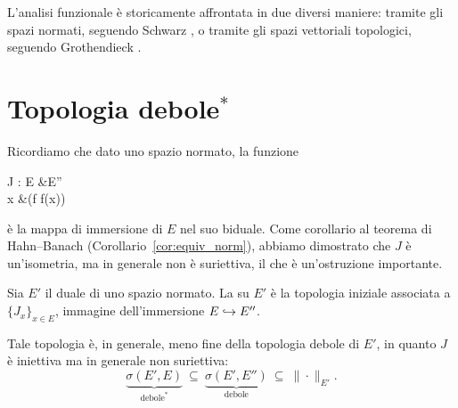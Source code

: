L'analisi funzionale è storicamente affrontata in due diversi maniere: tramite gli spazi normati, seguendo Schwarz \cite{dunford1958linear,dunford1965linear}, o tramite gli spazi vettoriali topologici, seguendo Grothendieck \cite{grothendieck1973topological}.

\section{Topologia debole$^*$}
Ricordiamo che dato uno spazio normato, la funzione
\begin{eqalign}
	J : E &\longto E''\\
	x &\longmapsto (f \mapsto f(x))
\end{eqalign}
è la mappa di immersione di $E$ nel suo biduale. Come corollario al teorema di Hahn--Banach (Corollario~\ref{cor:equiv_norm}), abbiamo dimostrato che $J$ è un'isometria, ma in generale non è suriettiva, il che è un'ostruzione importante.

\begin{definition}
	Sia $E'$ il duale di uno spazio normato. La  su $E'$ è la topologia iniziale associata a $\{J_x\}_{x \in E}$, immagine dell'immersione $E \hookrightarrow E''$.
\end{definition}

\begin{remark}
	Tale topologia è, in generale, meno fine della topologia debole di $E'$, in quanto $J$ è iniettiva ma in generale non suriettiva:
	\begin{equation*}
		\underbrace{\sigma(E',E)}_{\text{debole}^*} \ \subseteq\ \underbrace{\sigma(E',E'')}_{\text{debole}} \ \subseteq\ \|\cdot\|_{E'}.
	\end{equation*}
\end{remark}

